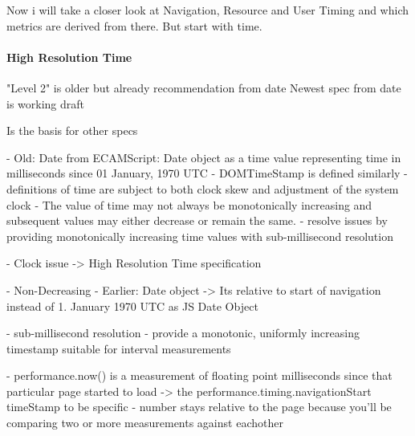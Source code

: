 



Now i will take a closer look at Navigation, Resource and User Timing and which metrics are derived from there.
But start with time.






\paragraph{High Resolution Time}


"Level 2" is older but already recommendation from date %
Newest spec from date is working draft %

Is the basis for other specs




- Old: Date from ECAMScript: Date object as a time value representing time in milliseconds since 01 January, 1970 UTC
-  DOMTimeStamp is defined similarly
- definitions of time are subject to both clock skew and adjustment of the system clock
- The value of time may not always be monotonically increasing and subsequent values may either decrease or remain the same.
- resolve issues by providing monotonically increasing time values with sub-millisecond resolution

- Clock issue -> High Resolution Time specification

- Non-Decreasing
- Earlier: Date object
-> Its relative to start of navigation instead of 1. January 1970 UTC as JS Date Object

- sub-millisecond resolution
- provide a monotonic, uniformly increasing timestamp suitable for interval measurements


- performance.now() is a measurement of floating point milliseconds since that particular page started to load
-> the performance.timing.navigationStart timeStamp to be specific
- number stays relative to the page because you'll be comparing two or more measurements against eachother



